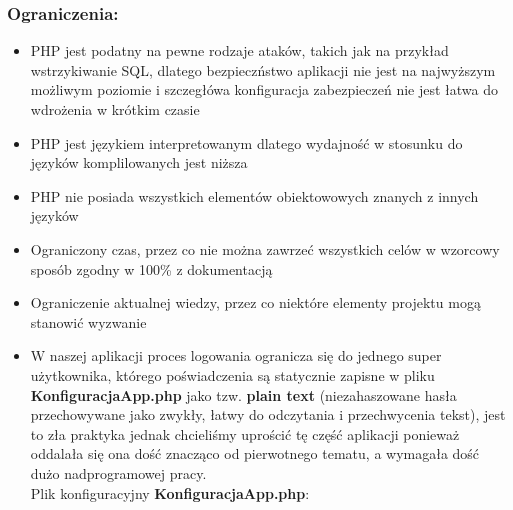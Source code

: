 \subsubsection{Ograniczenia:}
    \begin{itemize}
        \item PHP jest podatny na pewne rodzaje ataków, takich jak na przykład wstrzykiwanie SQL, dlatego bezpieczństwo aplikacji nie jest na najwyższym możliwym poziomie i szczegłówa konfiguracja zabezpieczeń nie jest łatwa do wdrożenia w krótkim czasie
        \item PHP jest językiem interpretowanym dlatego wydajność w stosunku do języków komplilowanych jest niższa
        \item PHP nie posiada wszystkich elementów obiektowowych znanych z innych języków
        \item Ograniczony czas, przez co nie można zawrzeć wszystkich celów w wzorcowy sposób zgodny w 100\% z dokumentacją
        \item Ograniczenie aktualnej wiedzy, przez co niektóre elementy projektu mogą stanowić wyzwanie
        \item W naszej aplikacji proces logowania ogranicza się do jednego super użytkownika, którego poświadczenia są statycznie zapisne w pliku \textbf{KonfiguracjaApp.php} jako tzw. \textbf{plain text} (niezahaszowane hasła przechowywane jako zwykły, łatwy do odczytania i przechwycenia tekst), jest to zła praktyka jednak chcieliśmy uprościć tę część aplikacji ponieważ oddalała się ona dość znacząco od pierwotnego tematu, a wymagała dość dużo nadprogramowej pracy.\\
        Plik konfiguracyjny \textbf{KonfiguracjaApp.php}:
         
        
    \end{itemize}

\pagebreak

